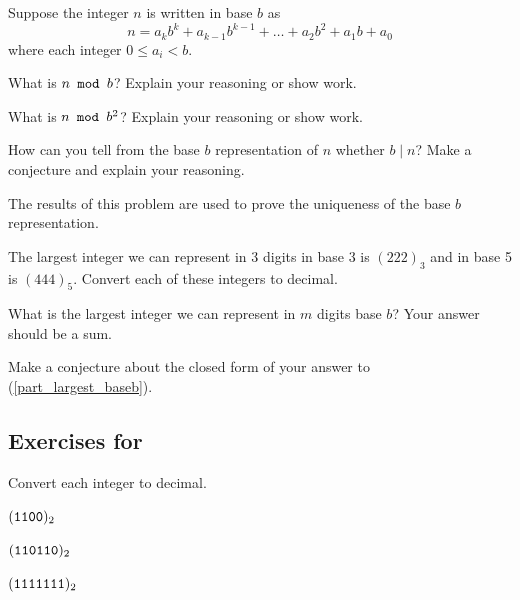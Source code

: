 \begin{exer}[\exerE] %
\label{exer_divides_baseb} 
    Suppose the integer $n$ is written in base $b$ as $$n = a_kb^k + a_{k-1}b^{k-1} + \ldots + a_2b^2 + a_1b + a_0$$ where each integer $0 \le a_i < b$. 
    \begin{exerpart}
        \item What is $n \texttt{ mod } b$? Explain your reasoning or show work.
        \item What is $n \texttt{ mod }b^2$? Explain your reasoning or show work.
        \item How can you tell from the base $b$ representation of $n$ whether $b \mid n$?  Make a conjecture and explain your reasoning. 
    \end{exerpart}
\end{exer}

\begin{exer}[\exerE] %
\label{exer_largest_baseb}
    The results of this problem are used to prove the uniqueness of the base $b$ representation.
    \begin{exerpart}
        \item  The largest integer we can represent in 3 digits in base 3 is $(222)_3$ and in base 5 is $(444)_5$.  Convert each of these integers to decimal.
        \item \label{part_largest_baseb} What is the largest integer we can represent in $m$ digits base $b$?  Your answer should be a sum.
        \item Make a conjecture about the closed form of your answer to (\ref{part_largest_baseb}).
    \end{exerpart}
\end{exer}


\subsection*{Exercises for  \subbinary}

\begin{exer}[\exerP] %
\label{exer_conv_from_binary}
    Convert each integer to decimal. 
        \begin{exerpart}
            \item $(\texttt{1100})_2$
            \item $(\texttt{110110})_2$ 
            \item $(\texttt{1111111})_2$
        \end{exerpart}  
\end{exer}

